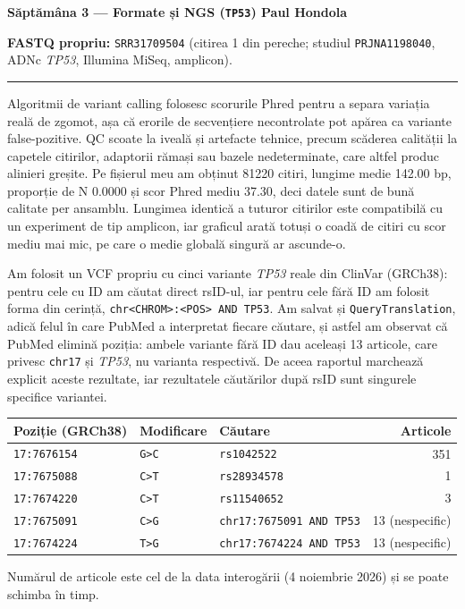 \documentclass[10pt,a4paper]{article}
\newcommand{\taskheading}[1]{\vspace{6pt}{\normalsize\bfseries #1}\par\vspace{1pt}}
\begin{document}
{\large\bfseries Săptămâna 3 — Formate și NGS (\texttt{TP53}) \hfill Paul Hondola}\par\vspace{2pt}
{\footnotesize\textbf{FASTQ propriu:} \texttt{SRR31709504} (citirea 1 din pereche; studiul \texttt{PRJNA1198040}, ADNc \emph{TP53}, Illumina MiSeq, amplicon).}\par
\vspace{2pt}\hrule\vspace{3pt}

\taskheading{De ce este important QC înainte de variant calling?}
Algoritmii de variant calling folosesc scorurile Phred pentru a separa variația reală de zgomot, așa că erorile de secvențiere necontrolate pot apărea ca variante false-pozitive. QC scoate la iveală și artefacte tehnice, precum scăderea calității la capetele citirilor, adaptorii rămași sau bazele nedeterminate, care altfel produc alinieri greșite. Pe fișierul meu am obținut 81220 citiri, lungime medie 142.00 bp, proporție de N 0.0000 și scor Phred mediu 37.30, deci datele sunt de bună calitate per ansamblu. Lungimea identică a tuturor citirilor este compatibilă cu un experiment de tip amplicon, iar graficul arată totuși o coadă de citiri cu scor mediu mai mic, pe care o medie globală singură ar ascunde-o.

\taskheading{Cum am formulat căutările PubMed pentru variante}
Am folosit un VCF propriu cu cinci variante \emph{TP53} reale din ClinVar (GRCh38): pentru cele cu ID am căutat direct rsID-ul, iar pentru cele fără ID am folosit forma din cerință, \texttt{chr<CHROM>:<POS> AND TP53}. Am salvat și \texttt{QueryTranslation}, adică felul în care PubMed a interpretat fiecare căutare, și astfel am observat că PubMed elimină poziția: ambele variante fără ID dau aceleași 13 articole, care privesc \texttt{chr17} și \emph{TP53}, nu varianta respectivă. De aceea raportul marchează explicit aceste rezultate, iar rezultatele căutărilor după rsID sunt singurele specifice variantei.

\begin{center}
\footnotesize
\begin{tabular}{lll r}
\toprule
\textbf{Poziție (GRCh38)} & \textbf{Modificare} & \textbf{Căutare} & \textbf{Articole} \\
\midrule
\texttt{17:7676154} & \texttt{G>C} & \texttt{rs1042522} & 351 \\
\texttt{17:7675088} & \texttt{C>T} & \texttt{rs28934578} & 1 \\
\texttt{17:7674220} & \texttt{C>T} & \texttt{rs11540652} & 3 \\
\texttt{17:7675091} & \texttt{C>G} & \texttt{chr17:7675091 AND TP53} & 13 (nespecific) \\
\texttt{17:7674224} & \texttt{T>G} & \texttt{chr17:7674224 AND TP53} & 13 (nespecific) \\
\bottomrule
\end{tabular}
\end{center}

{\footnotesize Numărul de articole este cel de la data interogării (4 noiembrie 2026) și se poate schimba în timp.}
\end{document}
